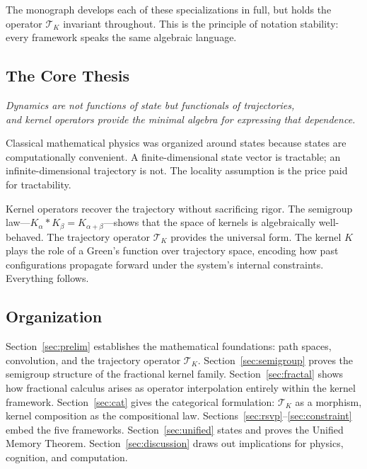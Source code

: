 \documentclass[12pt]{article}
\newcommand{\TK}{\mathcal{T}_K}
\begin{document}
The monograph develops each of these specializations in full, but holds the
operator $\TK$ invariant throughout. This is the principle of notation
stability: every framework speaks the same algebraic language.

\subsection{The Core Thesis}

\medskip
\begin{center}
\textit{Dynamics are not functions of state but functionals of trajectories,\\
and kernel operators provide the minimal algebra for expressing that dependence.}
\end{center}
\medskip

Classical mathematical physics was organized around states because states
are computationally convenient. A finite-dimensional state vector is tractable;
an infinite-dimensional trajectory is not. The locality assumption is the
price paid for tractability.

Kernel operators recover the trajectory without sacrificing rigor. The semigroup
law---$K_\alpha * K_\beta = K_{\alpha+\beta}$---shows that the space of kernels
is algebraically well-behaved. The trajectory operator $\TK$ provides the
universal form. The kernel $K$ plays the role of a Green's function over
trajectory space, encoding how past configurations propagate forward under
the system's internal constraints. Everything follows.

\subsection{Organization}

Section~\ref{sec:prelim} establishes the mathematical foundations: path spaces,
convolution, and the trajectory operator $\TK$. Section~\ref{sec:semigroup}
proves the semigroup structure of the fractional kernel family.
Section~\ref{sec:fractal} shows how fractional calculus arises as operator
interpolation entirely within the kernel framework. Section~\ref{sec:cat}
gives the categorical formulation: $\TK$ as a morphism, kernel composition as
the compositional law. Sections~\ref{sec:rsvp}--\ref{sec:constraint} embed
the five frameworks. Section~\ref{sec:unified} states and proves the Unified
Memory Theorem. Section~\ref{sec:discussion} draws out implications for
physics, cognition, and computation.
\end{document}
